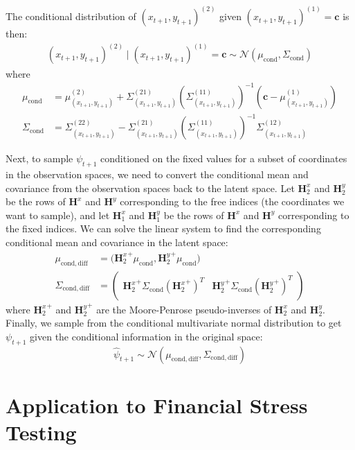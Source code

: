 \documentclass[11pt]{article}
\theoremstyle{plain}
\theoremstyle{definition}
\theoremstyle{remark}
\numberwithin{equation}{section}
\begin{document}
The conditional distribution of $(x_{t+1}, y_{t+1})^{(2)}$ given $(x_{t+1}, y_{t+1})^{(1)} = \mathbf{c}$ is then:
\begin{align*}(x_{t+1}, y_{t+1})^{(2)} \mid (x_{t+1}, y_{t+1})^{(1)} = \mathbf{c} \sim \mathcal{N}\left(\mu_{\mathrm{cond}}, \Sigma_{\mathrm{cond}}\right)
\end{align*}
   where
\begin{align*}
   \mu_{\mathrm{cond}} &= \mu_{(x_{t+1}, y_{t+1})}^{(2)} + \Sigma_{(x_{t+1}, y_{t+1})}^{(21)} (\Sigma_{(x_{t+1}, y_{t+1})}^{(11)})^{-1} (\mathbf{c} - \mu_{(x_{t+1}, y_{t+1})}^{(1)})\\
   \Sigma_{\mathrm{cond}} &= \Sigma_{(x_{t+1}, y_{t+1})}^{(22)} - \Sigma_{(x_{t+1}, y_{t+1})}^{(21)} (\Sigma_{(x_{t+1}, y_{t+1})}^{(11)})^{-1} \Sigma_{(x_{t+1}, y_{t+1})}^{(12)}
\end{align*}

Next, to sample $\psi_{t+1}$ conditioned on the fixed values for a subset of coordinates in the observation spaces, we need to convert the conditional mean and covariance from the observation spaces back to the latent space. Let $\mathbf{H}^x_{2}$ and $\mathbf{H}^y_{2}$ be the rows of $\mathbf{H}^x$ and $\mathbf{H}^y$ corresponding to the free indices (the coordinates we want to sample), and let $\mathbf{H}^x_{1}$ and $\mathbf{H}^y_{1}$  be the rows of $\mathbf{H}^x$ and $\mathbf{H}^y$ corresponding to the fixed indices. We can solve the linear system to find the corresponding conditional mean and covariance in the latent space:
\begin{align*}\mu_{\mathrm{cond, diff}}& = {(\mathbf{H}^x_{2}}^{+} \mu_{\mathrm{cond}}, {\mathbf{H}^y_{2}}^{+} \mu_{\mathrm{cond}})\\\Sigma_{\mathrm{cond, diff}} &= \begin{pmatrix} {\mathbf{H}^x_{2}}^{+} \Sigma_{\mathrm{cond}} ({\mathbf{H}^x_{2}}^{+})^T & {\mathbf{H}^y_{2}}^{+} \Sigma_{\mathrm{cond}} ({\mathbf{H}^y_{2}}^{+})^T\end{pmatrix}
\end{align*}
where ${\mathbf{H}^x_{2}}^{+}$ and ${\mathbf{H}^y_{2}}^{+}$ are the Moore-Penrose pseudo-inverses of $\mathbf{H}^x_{2}$ and $\mathbf{H}^y_{2}$.
Finally, we sample from the conditional multivariate normal distribution to get $\psi_{t+1}$ given the conditional information in the original space:
\[\hat\psi_{t+1} \sim \mathcal{N}(\mu_{\mathrm{cond, diff}}, \Sigma_{\mathrm{cond, diff}})\]

\section{Application to Financial Stress Testing}
\label{sec:validation}
\end{document}
